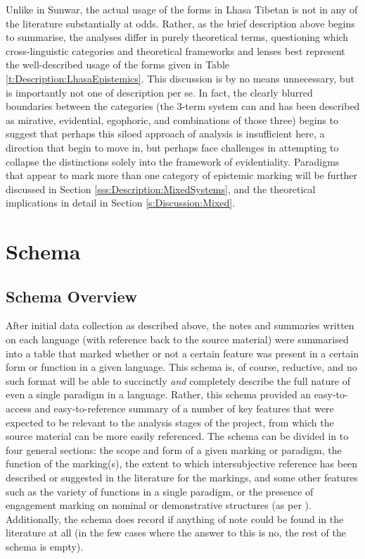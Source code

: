 Unlike in Sunwar, the actual usage of the forms in Lhasa Tibetan is not in any of the literature substantially at odds. Rather, as the brief description above begins to summarise, the analyses differ in purely theoretical terms, questioning which cross-linguistic categories and theoretical frameworks and lenses best represent the well-described usage of the forms given in Table \ref{t:Description:LhasaEpistemics}. This discussion is by no means unnecessary, but is importantly not one of description per se. In fact, the clearly blurred boundaries between the categories (the 3-term system can and has been described as mirative, evidential, egophoric, and combinations of those three) begins to suggest that perhaps this siloed approach of analysis is insufficient here, a direction that  begin to move in, but perhaps face challenges in attempting to collapse the distinctions solely into the framework of evidentiality. Paradigms that appear to mark more than one category of epistemic marking will be further discussed in Section \ref{sss:Description:MixedSystems}, and the theoretical implications in detail in Section \ref{s:Discussion:Mixed}.


\section{Schema}\label{s:Methods:Schema}
\subsection{Schema Overview}
After initial data collection as described above, the notes and summaries written on each language (with reference back to the source material) were summarised into a table that marked whether or not a certain feature was present in a certain form or function in a given language. This schema is, of course, reductive, and no such format will be able to succinctly \textit{and} completely describe the full nature of even a single paradigm in a language. Rather, this schema provided an easy-to-access and easy-to-reference summary of a number of key features that were expected to be relevant to the analysis stages of the project, from which the source material can be more easily referenced. The schema can be divided in to four general sections: the scope and form of a given marking or paradigm, the function of the marking(s), the extent to which intersubjective reference has been described or suggested in the literature for the markings, and some other features such as the variety of functions in a single paradigm, or the presence of engagement marking on nominal or demonstrative structures (as per ). Additionally, the schema does record if anything of note could be found in the literature at all (in the few cases where the answer to this is no, the rest of the schema is empty).

